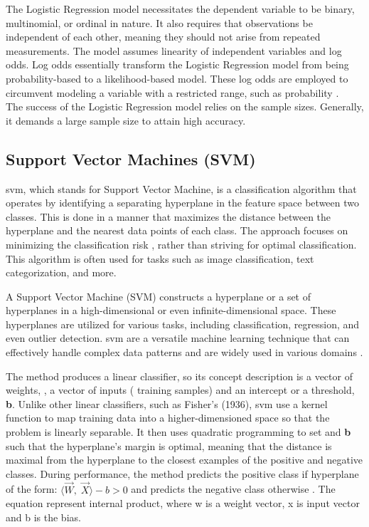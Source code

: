 The Logistic Regression model necessitates the dependent variable to be binary, multinomial, or ordinal in nature. It also requires that observations be independent of each other, meaning they should not arise from repeated measurements. The model assumes linearity of independent variables and log odds. Log odds essentially transform the Logistic Regression model from being probability-based to a likelihood-based model. These log odds are employed to circumvent modeling a variable with a restricted range, such as probability \cite{LogOdd}.\\

The success of the Logistic Regression model relies on the sample sizes. Generally, it demands a large sample size to attain high accuracy.


\subsection{Support Vector Machines (SVM)} %
\label{sub: Support_Vector_Machines}

\gls{svm}, which stands for Support Vector Machine, is a classification algorithm that operates by identifying a separating hyperplane in the feature space between two classes. This is done in a manner that maximizes the distance between the hyperplane and the nearest data points of each class. The approach focuses on minimizing the classification risk \cite{Vladimir2013}, rather than striving for optimal classification. This algorithm is often used for tasks such as image classification, text categorization, and more.

A Support Vector Machine (SVM) constructs a hyperplane or a set of hyperplanes in a high-dimensional or even infinite-dimensional space. These hyperplanes are utilized for various tasks, including classification, regression, and even outlier detection. \gls{svm} are a versatile machine learning technique that can effectively handle complex data patterns and are widely used in various domains \cite{scikit_learn2023}.

The method produces a linear classifier, so its concept description is a vector of weights, , a vector of inputs ( training samples)  and an intercept or a threshold, \textbf{b}. Unlike other linear classifiers, such as Fisher’s (1936), \gls{svm} use a kernel function \cite{scikit_learn2023} to map training data into a higher-dimensioned space so that the problem is linearly separable. It then uses quadratic programming to set  and \textbf{b} such that the hyperplane’s margin is optimal, meaning that the distance is maximal from the hyperplane to the closest examples of the positive and negative classes. During performance, the method predicts the positive class if hyperplane of the form:  
$\langle \overrightarrow{W} , \; \overrightarrow{X} \rangle - b > 0$ and predicts the negative class otherwise \cite{J_Zico_Kolter2006}. The equation represent internal product, where w is a weight vector, x is input vector and b is the bias.
 
